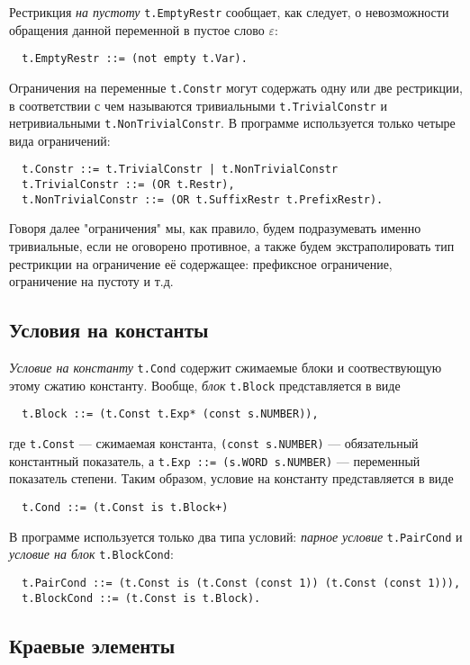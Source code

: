 \documentclass[12pt]{article}
\begin{document}
Рестрикция \textit{на пустоту} \texttt{t.EmptyRestr} сообщает, как следует, о
невозможности обращения данной переменной в пустое слово $\varepsilon$:
\begin{Verbatim}
  t.EmptyRestr ::= (not empty t.Var).
\end{Verbatim}

Ограничения на переменные \texttt{t.Constr} могут содержать одну или две
рестрикции, в соответствии с чем называются тривиальными
\texttt{t.TrivialConstr} и нетривиальными \texttt{t.NonTrivialConstr}. В
программе используется только четыре вида ограничений:
\begin{Verbatim}
  t.Constr ::= t.TrivialConstr | t.NonTrivialConstr
  t.TrivialConstr ::= (OR t.Restr),
  t.NonTrivialConstr ::= (OR t.SuffixRestr t.PrefixRestr).
\end{Verbatim}

Говоря далее "ограничения" мы, как правило, будем подразумевать именно
тривиальные, если не оговорено противное, а также будем экстраполировать
тип рестрикции на ограничение её содержащее: префиксное ограничение,
ограничение на пустоту и т.д.

\subsection{Условия на константы}

\textit{Условие на константу} \texttt{t.Cond} содержит сжимаемые блоки и
соотвествующую этому сжатию константу. Вообще, \textit{блок} \texttt{t.Block}
представляется в виде
\begin{Verbatim}
  t.Block ::= (t.Const t.Exp* (const s.NUMBER)),
\end{Verbatim}
где \texttt{t.Const} --- сжимаемая константа, \texttt{(const s.NUMBER)} ---
обязательный константный показатель, а \texttt{t.Exp ::= (s.WORD s.NUMBER)}
--- переменный показатель степени. Таким образом, условие на константу
представляется в виде
\begin{Verbatim}
  t.Cond ::= (t.Const is t.Block+)
\end{Verbatim}
В программе используется только два типа условий: \textit{парное условие}
\texttt{t.PairCond} и \textit{условие на блок} \texttt{t.BlockCond}:
\begin{Verbatim}
  t.PairCond ::= (t.Const is (t.Const (const 1)) (t.Const (const 1))),
  t.BlockCond ::= (t.Const is t.Block).
\end{Verbatim}

\subsection{Краевые элементы}
\end{document}
